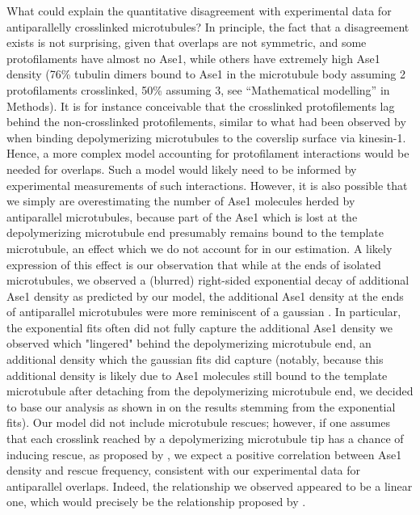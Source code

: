 What could explain the quantitative disagreement with experimental data for antiparallelly crosslinked microtubules? In principle, the fact that a disagreement exists is not surprising, given that overlaps are not symmetric, and some protofilaments have almost no Ase1, while others have extremely high Ase1 density (76\% tubulin dimers bound to Ase1 in the microtubule body assuming 2 protofilaments crosslinked, 50\% assuming 3, see “Mathematical modelling” in Methods). It is for instance conceivable that the crosslinked protofilements lag behind the non-crosslinked protofilements, similar to what had been observed by \cite{Peet2018} when binding depolymerizing microtubules to the coverslip surface via kinesin-1. Hence, a more complex model accounting for protofilament interactions would be needed for overlaps. Such a model would likely need to be informed by experimental measurements of such interactions. However, it is also possible that we simply are overestimating the number of Ase1 molecules herded by antiparallel microtubules, because part of the Ase1 which is lost at the depolymerizing microtubule end presumably remains bound to the template microtubule, an effect which we do not account for in our estimation. A likely expression of this effect is our observation that while at the ends of isolated microtubules, we observed a (blurred) right-sided exponential decay of additional Ase1 density as predicted by our model, the additional Ase1 density at the ends of antiparallel microtubules were more reminiscent of a gaussian . In particular, the exponential fits often did not fully capture the additional Ase1 density we observed which "lingered" behind the depolymerizing microtubule end, an additional density which the gaussian fits did capture (notably, because this additional density is likely due to Ase1 molecules still bound to the template microtubule after detaching from the depolymerizing microtubule end, we decided to base our analysis as shown in  on the results stemming from the exponential fits).
Our model did not include microtubule rescues; however, if one assumes that each crosslink reached by a depolymerizing microtubule tip has a chance of inducing rescue, as proposed by \cite{Stoppin-Mellet2013}, we expect a positive correlation between Ase1 density and rescue frequency, consistent with our experimental data for antiparallel overlaps. Indeed, the relationship we observed appeared to be a linear one, which would precisely be the relationship proposed by \cite{Stoppin-Mellet2013}.\par 

